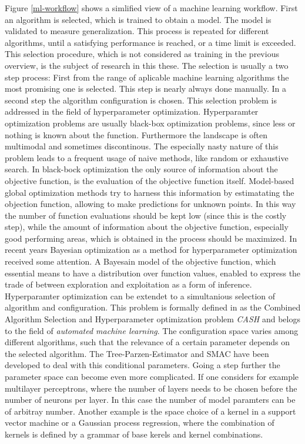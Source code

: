 \documentclass[english]{article}
\begin{document}
Figure \ref{ml-workflow} shows a simlified view of a machine learning workflow. First an algorithm is selected, which is trained to obtain a model. The model is validated to measure generalization. This process is repeated for different algorithms, until a satisfying performance is reached, or a time limit is exceeded. This selection procedure, which is not considered as training in the previous overview, is the subject of research in this these.
The selection is usually a two step process: First from the range of aplicable machine learning algorithms the most promising one is selected. This step is nearly always done manually. In a second step the algorithm configuration is chosen. This selection problem is addressed in the field of hyperparameter optimization.
Hyperparamter optimization problems are usually black-box optimization problems, since less or nothing is known about the function. Furthermore the  landscape is often multimodal and sometimes discontinous. The especially nasty nature of this problem leads to a frequent usage of naive methods, like random or exhaustive search.
In black-bock optimization the only source of information about the objective function, is the evaluation of the objective function itself. Model-based global optimization methods try to harness this information by estimatating the objection function, allowing to make predictions for unknown points. In this way the number of function evaluations should be kept low (since this is the costly step), while the amount of information about the objective function, especially good performing areas, which is obtained in the process should be maximized.
In recent years Bayesian optimization as a method for hyperparameter optimization received some attention. A Bayesain model of the objective function, which essential means to have a distribution over function values, enabled to express the trade of between exploration and exploitation as a form of inference.
Hyperparamter optimization can be extendet to a simultanious selection of algorithm and configuration. This problem is formally defined in \cite{feurer_efficient_2015} as the Combined Algorithm Selection and Hyperparameter optimization problem \textit{CASH} and belogs to the field of \textit{automated machine learning}. The configuration space varies among different algorithms, such that the relevance of a certain parameter depends on the selected algorithm. The Tree-Parzen-Estimator and SMAC have been developed to deal with this conditional parameters.
Going a step further the parameter space can become even more complicated. If one considers for example multilayer perceptrons, where the number of layers needs to be chosen before the number of neurons per layer. In this case the number of model paramters can be of arbitray number. Another example is the space choice of a kernel in a support vector machine or a Gaussian process regression, where the combination of kernels is defined by a grammar of base kerels and kernel combinations.
\end{document}
